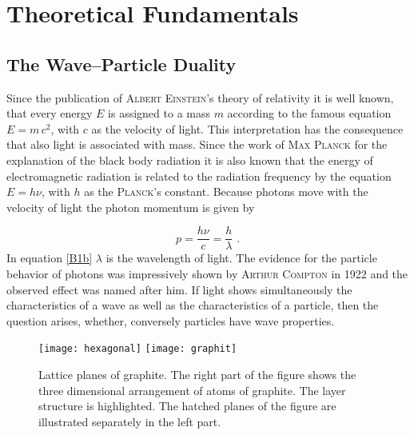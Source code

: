 \documentclass{tudphygp_eng}
\begin{document}
\section{Theoretical Fundamentals}
\subsection{The Wave--Particle Duality}
Since the publication of \textsc{Albert Einstein}'s theory of relativity it is well known, that every energy $E$ is assigned to a mass $m$ according to the famous equation $E=m\,c^2$, with $c$ as the velocity of light. This interpretation has the consequence that also light is associated with mass. Since the work of \textsc{Max Planck} for the explanation of the black body radiation it is also known that the energy of electromagnetic radiation is related to the radiation frequency by the equation $E=h\nu$, with $h$ as the \textsc{Planck}'s constant. Because photons move with the velocity of light the photon momentum is given by

\begin{equation}
p=\frac{h\nu}{c}=\frac{h}{\lambda}\,\,.\label{B1b}
\end{equation}
In equation \ref{B1b} $ \lambda$ is the wavelength of light. The evidence for the particle behavior of photons was impressively shown by \textsc{Arthur Compton} in 1922 and the observed effect was named after him. If light shows simultaneously the characteristics of a wave as well as the characteristics of a particle, then the question arises, whether, conversely particles have wave properties.

\begin{figure}[htb]
\centering
\texttt{[image: hexagonal]}
\hspace{1cm}
\texttt{[image: graphit]}
\caption{Lattice planes of graphite. The right part of the figure shows the three dimensional arrangement of atoms of graphite. The layer structure is highlighted. The hatched planes of the figure are illustrated separately in the left part. 
\label{hexagonal}}
\end{figure}
\end{document}
